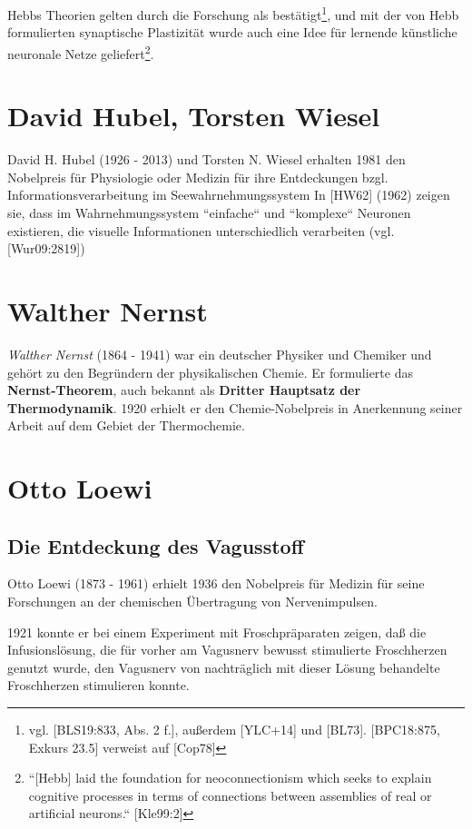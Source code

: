 Hebbs Theorien gelten durch die Forschung als bestätigt\footnote{
vgl. [BLS19:833, Abs. 2 f.], außerdem [YLC+14] und [BL73]. [BPC18:875, Exkurs 23.5] verweist auf [Cop78]
}, und mit der von Hebb formulierten synaptische Plastizität wurde auch eine Idee für lernende künstliche neuronale Netze geliefert\footnote{
``[Hebb] laid the foundation for neoconnectionism which seeks to explain cognitive processes in terms of connections between assemblies of real or artificial neurons.`` [Kle99:2]
}.


\section{David Hubel, Torsten Wiesel}\label{appendix:hubelwiesel}

David H. Hubel (1926 - 2013) und Torsten N. Wiesel erhalten 1981 den Nobelpreis für Physiologie oder Medizin  für ihre Entdeckungen bzgl. Informationsverarbeitung im Seewahrnehmungssystem
In [HW62] (1962) zeigen sie, dass im Wahrnehmungssystem ``einfache`` und ``komplexe`` Neuronen existieren, die visuelle Informationen unterschiedlich verarbeiten (vgl. [Wur09:2819])

\section{Walther Nernst}
\textit{Walther Nernst} (1864 - 1941) war ein deutscher Physiker und Chemiker und gehört zu den Begründern der physikalischen Chemie. Er formulierte das \textbf{Nernst-Theorem}, auch bekannt als \textbf{Dritter Hauptsatz der Thermodynamik}. 1920 erhielt er den Chemie-Nobelpreis in Anerkennung seiner Arbeit auf dem Gebiet der Thermochemie.


\section{Otto Loewi}
\subsection*{Die Entdeckung des Vagusstoff}

Otto Loewi (1873 - 1961) erhielt 1936 den Nobelpreis für Medizin für seine Forschungen an der chemischen Übertragung von Nervenimpulsen.

1921 konnte er bei einem Experiment mit Froschpräparaten zeigen, daß die Infusionslösung, die für vorher am Vagusnerv bewusst stimulierte Froschherzen genutzt wurde, den Vagusnerv von nachträglich mit dieser Lösung behandelte Froschherzen stimulieren konnte.

